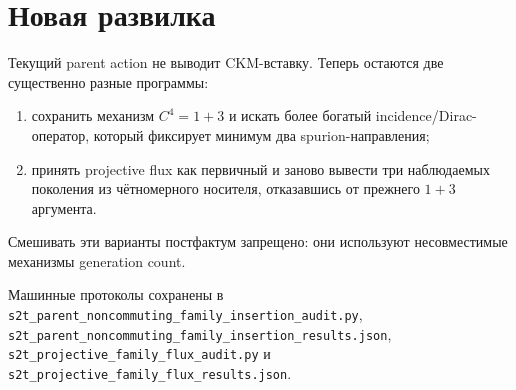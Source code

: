 \documentclass[12pt,a4paper]{article}
\begin{document}
\section{Новая развилка}

Текущий parent action не выводит CKM-вставку. Теперь остаются две существенно
разные программы:
\begin{enumerate}
 \item сохранить механизм $C^4=1+3$ и искать более богатый incidence/Dirac-
 оператор, который фиксирует минимум два spurion-направления;
 \item принять projective flux как первичный и заново вывести три наблюдаемых
 поколения из чётномерного носителя, отказавшись от прежнего $1+3$ аргумента.
\end{enumerate}
Смешивать эти варианты постфактум запрещено: они используют несовместимые
механизмы generation count.

Машинные протоколы сохранены в
\texttt{s2t\_parent\_noncommuting\_family\_insertion\_audit.py},
\texttt{s2t\_parent\_noncommuting\_family\_insertion\_results.json},
\texttt{s2t\_projective\_family\_flux\_audit.py} и
\texttt{s2t\_projective\_family\_flux\_results.json}.
\end{document}
